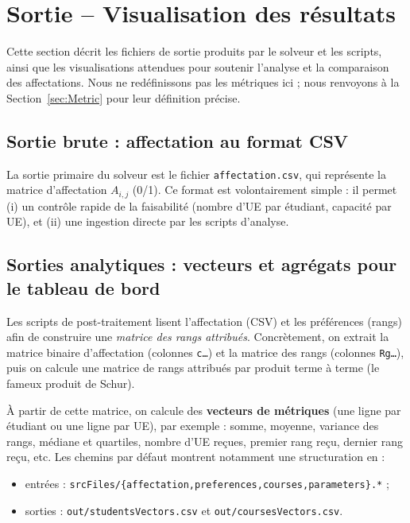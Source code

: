 \documentclass{rapport}
\theoremstyle{definition}
\theoremstyle{remark}
\theoremstyle{plain}
\theoremstyle{definition}
\theoremstyle{definition}
\theoremstyle{remark}
\theoremstyle{definition}
\begin{document}
\section{Sortie -- Visualisation des résultats}

Cette section décrit les fichiers de sortie produits par le solveur et les scripts, ainsi que les visualisations attendues pour soutenir l'analyse et la comparaison des affectations. Nous ne redéfinissons pas les métriques ici ; nous renvoyons à la Section~\ref{sec:Metric} pour leur définition précise.

\subsection{Sortie brute : affectation au format CSV}

La sortie primaire du solveur est le fichier \texttt{affectation.csv}, qui représente la matrice d'affectation $A_{i,j}$ (0/1). Ce format est volontairement simple : il permet (i) un contrôle rapide de la faisabilité (nombre d'UE par étudiant, capacité par UE), et (ii) une ingestion directe par les scripts d'analyse.

\subsection{Sorties analytiques : vecteurs et agrégats pour le tableau de bord}

Les scripts de post-traitement lisent l'affectation (CSV) et les préférences (rangs) afin de construire une \emph{matrice des rangs attribués}. Concrètement, on extrait la matrice binaire d'affectation (colonnes \texttt{c\ldots}) et la matrice des rangs (colonnes \texttt{Rg\ldots}), puis on calcule une matrice de rangs attribués par produit terme à terme (le fameux produit de Schur).

À partir de cette matrice, on calcule des \textbf{vecteurs de métriques} (une ligne par étudiant ou une ligne par UE), par exemple : somme, moyenne, variance des rangs, médiane et quartiles, nombre d'UE reçues, premier rang reçu, dernier rang reçu, etc. Les chemins par défaut montrent notamment une structuration en :
\begin{itemize}
    \item entrées : \texttt{srcFiles/\{affectation,preferences,courses,parameters\}.*} ;
    \item sorties : \texttt{out/studentsVectors.csv} et \texttt{out/coursesVectors.csv}.
\end{itemize}
\end{document}
